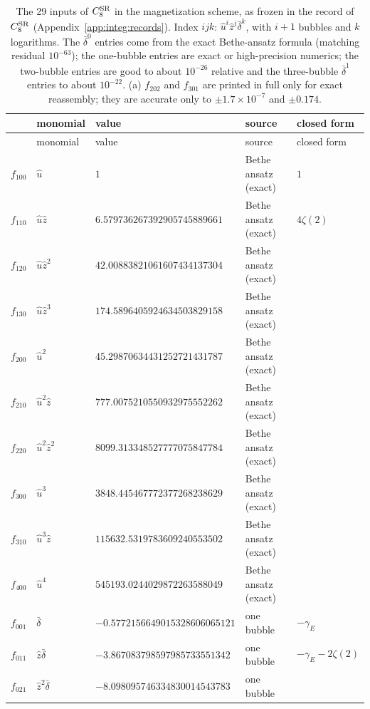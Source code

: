 \documentclass[11pt,a4paper]{article}
\numberwithin{equation}{section}
\newcommand{\CSR}{C^{\rm SR}}
\newcommand{\db}{\bar\delta}
\newcommand{\sci}[2]{#1\times10^{#2}}
\begin{document}
{\small
\renewcommand{\arraystretch}{1.1}
\begin{longtable}{@{}lllll@{}}
\caption{The 29 inputs of $\CSR_8$ in the magnetization scheme, as frozen in the record of $\CSR_8$
(Appendix~\ref{app:integ:records}). Index $ijk$: $\hat u^i\hat z^j\db^k$, with $i+1$ bubbles and $k$ logarithms.
The $\db^0$ entries come from the exact Bethe-ansatz formula (matching residual $10^{-63}$); the one-bubble entries are exact or
high-precision numerics; the two-bubble entries are good to about $10^{-26}$ relative and the three-bubble $\db^1$
entries to about $10^{-22}$. (a) $f_{202}$ and $f_{301}$ are printed in full only for exact reassembly; they are
accurate only to $\pm\sci{1.7}{-7}$ and $\pm0.174$.}\label{tab:integ:inputs}\\
\toprule
& monomial & value & source & closed form\\
\midrule\endfirsthead
\toprule
& monomial & value & source & closed form\\
\midrule\endhead
\bottomrule\endfoot
$f_{100}$ & $\hat u$ & $1$ & Bethe ansatz (exact) & $1$\\
$f_{110}$ & $\hat u\hat z$ & $6.579736267392905745889661$ & Bethe ansatz (exact) & $4\zeta(2)$\\
$f_{120}$ & $\hat u\hat z^2$ & $42.00883821061607434137304$ & Bethe ansatz (exact) & \\
$f_{130}$ & $\hat u\hat z^3$ & $174.5896405924634503829158$ & Bethe ansatz (exact) & \\
$f_{200}$ & $\hat u^2$ & $45.29870634431252721431787$ & Bethe ansatz (exact) & \\
$f_{210}$ & $\hat u^2\hat z$ & $777.0075210550932975552262$ & Bethe ansatz (exact) & \\
$f_{220}$ & $\hat u^2\hat z^2$ & $8099.313348527777075847784$ & Bethe ansatz (exact) & \\
$f_{300}$ & $\hat u^3$ & $3848.445467772377268238629$ & Bethe ansatz (exact) & \\
$f_{310}$ & $\hat u^3\hat z$ & $115632.5319783609240553502$ & Bethe ansatz (exact) & \\
$f_{400}$ & $\hat u^4$ & $545193.0244029872263588049$ & Bethe ansatz (exact) & \\
$f_{001}$ & $\db$ & $-0.5772156649015328606065121$ & one bubble & $-\gamma_E$\\
$f_{011}$ & $\hat z\db$ & $-3.867083798597985733551342$ & one bubble & $-\gamma_E-2\zeta(2)$\\
$f_{021}$ & $\hat z^2\db$ & $-8.098095746334830014543783$ & one bubble & \\

\end{longtable}}
\end{document}
